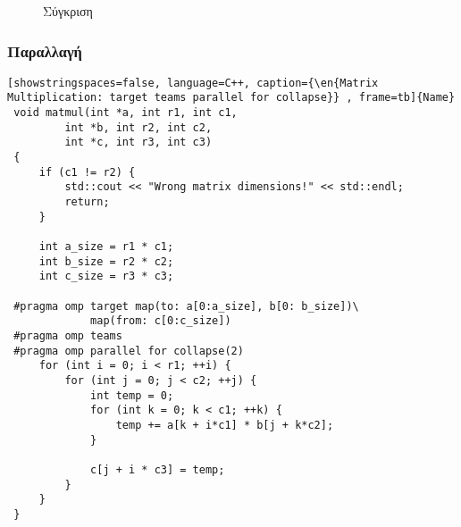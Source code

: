 \begin{figure}[h]
\centering 
\resizebox{0.55\textwidth}{!} {
}
  \caption{ Σύγκριση }

\end{figure}

\clearpage

\subsubsection{Παραλλαγή }
\begin{spacing}{0.6}
\begin{lstlisting}[showstringspaces=false, language=C++, caption={\en{Matrix Multiplication: target teams parallel for collapse}} , frame=tb]{Name}
 void matmul(int *a, int r1, int c1,
         int *b, int r2, int c2,
         int *c, int r3, int c3)
 {
     if (c1 != r2) {
         std::cout << "Wrong matrix dimensions!" << std::endl;
         return;
     }

     int a_size = r1 * c1;
     int b_size = r2 * c2;
     int c_size = r3 * c3;

 #pragma omp target map(to: a[0:a_size], b[0: b_size])\
 			 map(from: c[0:c_size])
 #pragma omp teams
 #pragma omp parallel for collapse(2)
     for (int i = 0; i < r1; ++i) {
         for (int j = 0; j < c2; ++j) {
             int temp = 0;
             for (int k = 0; k < c1; ++k) {
                 temp += a[k + i*c1] * b[j + k*c2];
             }

             c[j + i * c3] = temp;
         }
     }
 }
\end{lstlisting}
\end{spacing}

